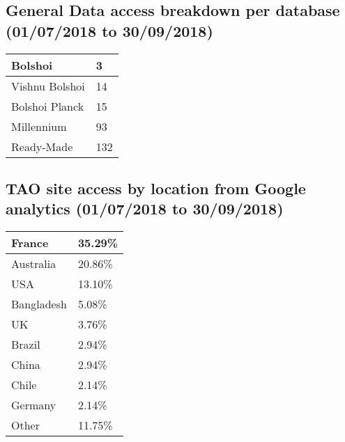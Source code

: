 \documentclass{article}%
\begin{document}
\subsection{General Data access breakdown per database (01/07/2018 to 30/09/2018)}%

%
\begin{longtabu}{X[l] X[l]}%
Bolshoi&3\\%
\hline%
Vishnu Bolshoi&14\\%
\hline%
Bolshoi Planck&15\\%
\hline%
Millennium&93\\%
\hline%
Ready{-}Made&132\\%
\hline%
\end{longtabu}%
\subsection{TAO site access by location from Google analytics (01/07/2018 to 30/09/2018)}%

%
\begin{longtabu}{X[l] X[l]}%
France&35.29\%\\%
\hline%
Australia&20.86\%\\%
\hline%
USA&13.10\%\\%
\hline%
Bangladesh&5.08\%\\%
\hline%
UK&3.76\%\\%
\hline%
Brazil&2.94\%\\%
\hline%
China&2.94\%\\%
\hline%
Chile&2.14\%\\%
\hline%
Germany&2.14\%\\%
\hline%
Other&11.75\%\\%
\hline%
\end{longtabu}%
\end{document}
